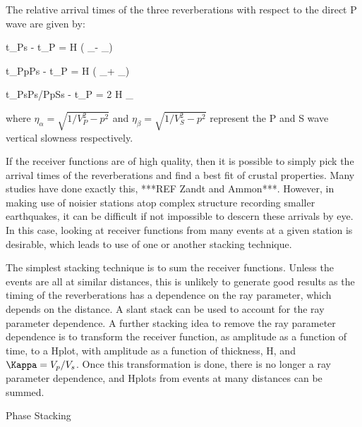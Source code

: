 The relative arrival times of the three reverberations with respect to the direct P wave are given by:

t_{Ps} - t_{P} = H ( \eta_\beta - \eta_\alpha )

t_{PpPs} - t_{P} = H ( \eta_\beta + \eta_\alpha )

t_{PsPs/PpSs} - t_{P} = 2 H \eta_\beta

where $\eta_\alpha = \sqrt{1/V_P^2 - p^2}$ and $\eta_\beta = \sqrt{1/V_S^2 - p^2}$ represent the P and S wave vertical slowness respectively.

If the receiver functions are of high quality, then it is possible to simply pick the arrival times of the reverberations and find a best fit of crustal properties. Many studies have done exactly this, ***REF Zandt and Ammon***. However, in making use of noisier stations atop complex structure recording smaller earthquakes, it can be difficult if not impossible to descern these arrivals by eye. In this case, looking at receiver functions from many events at a given station is desirable, which leads to use of one or another stacking technique.

The simplest stacking technique is to sum the receiver functions. Unless the events are all at similar distances, this is unlikely to generate good results as the timing of the reverberations has a dependence on the ray parameter, which depends on the distance. A slant stack can be used to account for the ray parameter dependence. A further stacking idea to remove the ray parameter dependence is to transform the receiver function, as amplitude as a function of time, to a H\Kappa plot, with amplitude as a function of thickness, H, and $\Kappa = V_p/V_s$. Once this transformation is done, there is no longer a ray parameter dependence, and H\Kappa plots from events at many distances can be summed.

Phase Stacking



 